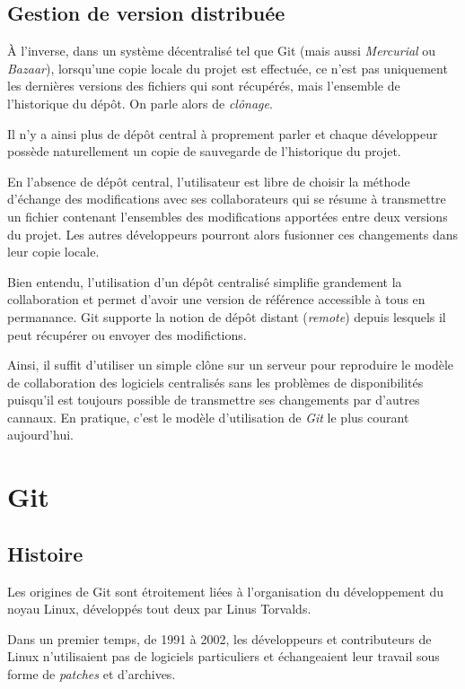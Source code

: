 \documentclass[11pt,a4paper]{article}
\begin{document}
\subsection{Gestion de version distribuée}

À l'inverse, dans un système décentralisé tel que Git (mais aussi \textit{Mercurial} ou \textit{Bazaar}), lorsqu'une copie locale du projet est effectuée, ce n'est pas uniquement les dernières versions des fichiers qui sont récupérés, mais l'ensemble de l'historique du dépôt. On parle alors de \textit{clônage}.

Il n'y a ainsi plus de dépôt central à proprement parler et chaque développeur possède naturellement un copie de sauvegarde de l'historique du projet.

En l'absence de dépôt central, l'utilisateur est libre de choisir la méthode d'échange des modifications avec ses collaborateurs qui se résume à transmettre un fichier contenant l'ensembles des modifications apportées entre deux versions du projet. Les autres développeurs pourront alors fusionner ces changements dans leur copie locale.

Bien entendu, l'utilisation d'un dépôt centralisé simplifie grandement la collaboration et permet d'avoir une version de référence accessible à tous en permanance. Git supporte la notion de dépôt distant (\textit{remote}) depuis lesquels il peut récupérer ou envoyer des modifictions.

Ainsi, il suffit d'utiliser un simple clône sur un serveur pour reproduire le modèle de collaboration des logiciels centralisés sans les problèmes de disponibilités puisqu'il est toujours possible de transmettre ses changements par d'autres cannaux. En pratique, c'est le modèle d'utilisation de \textit{Git} le plus courant aujourd'hui.

\section{Git}

\subsection{Histoire}

Les origines de Git sont étroitement liées à l'organisation du développement du noyau Linux, développés tout deux par Linus Torvalds.

Dans un premier temps, de 1991 à 2002, les développeurs et contributeurs de Linux n'utilisaient pas de logiciels particuliers et échangeaient leur travail sous forme de \textit{patches} et d'archives.
\end{document}
